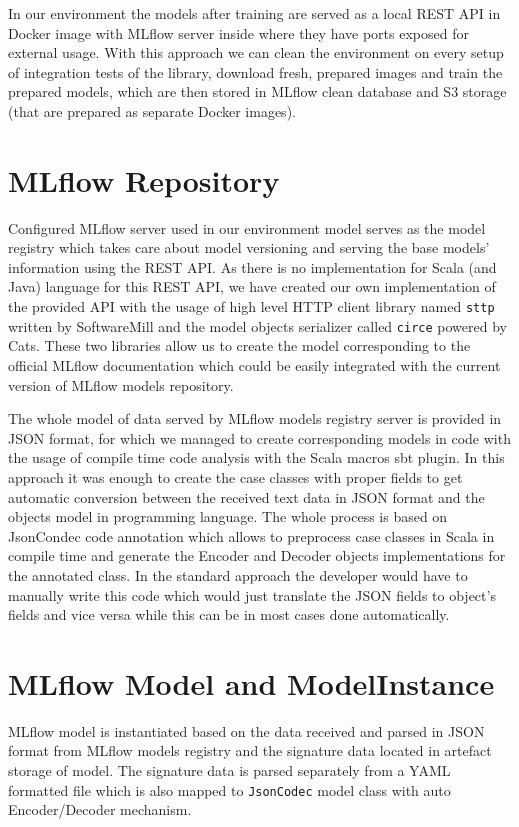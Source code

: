 In our environment the models after training are served as a local REST API in Docker image with MLflow
server inside where they have ports exposed for external usage. With this approach we can clean the
environment on every setup of integration tests of the library, download fresh, prepared images and
train the prepared models, which are then stored in MLflow clean database and S3 storage (that are
prepared as separate Docker images).

\section{MLflow Repository}

Configured MLflow server used in our environment model serves as the model registry which takes care
about model versioning and serving the base models' information using the REST API. As there is no
implementation for Scala (and Java) language for this REST API, we have created our own implementation
of the provided API with the usage of high level HTTP client library named \texttt{sttp} written by SoftwareMill
and the model objects serializer called \texttt{circe} powered by Cats. These two libraries allow us to create
the model corresponding to the official MLflow documentation which could be easily integrated with the
current version of MLflow models repository.

The whole model of data served by MLflow models registry server is provided in JSON format, for which
we managed to create corresponding models in code with the usage of compile time code analysis with
the Scala macros sbt plugin. In this approach it was enough to create the case classes with proper
fields to get automatic conversion between the received text data in JSON format and the objects
model in programming language. The whole process is based on JsonCondec code annotation which allows
to preprocess case classes in Scala in compile time and generate the Encoder and Decoder objects
implementations for the annotated class. In the standard approach the developer would have to manually
write this code which would just translate the JSON fields to object’s fields and vice versa while
this can be in most cases done automatically.

\section{MLflow Model and ModelInstance}

MLflow model is instantiated based on the data received and parsed in JSON format from MLflow models
registry and the signature data located in artefact storage of model. The signature data is parsed
separately from a YAML formatted file which is also mapped to \texttt{JsonCodec} model class with auto Encoder/Decoder
mechanism.

